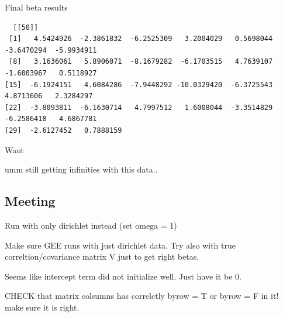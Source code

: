 \documentclass[10pt]{article}
\theoremstyle{definition}
\begin{document}
Final beta results
\begin{verbatim}
  [[50]]
 [1]   4.5424926  -2.3861832  -6.2525309   3.2004029   0.5698044  -3.6470294  -5.9934911
 [8]   3.1636061   5.8906071  -8.1679282  -6.1703515   4.7639107  -1.6003967   0.5118927
[15]  -6.1924151   4.6084286  -7.9448292 -10.0329420  -6.3725543   4.8713606   2.3284297
[22]  -3.8093811  -6.1630714   4.7997512   1.6008044  -3.3514829  -6.2586418   4.6867781
[29]  -2.6127452   0.7888159
\end{verbatim}

Want


umm still getting infinities with this data..



\subsection{Meeting}
Run with only dirichlet instead (set omega = 1)

Make sure GEE runs with just dirichlet data.
Try also with true correltion/covariance matrix V just to get right betas.

Seems like intercept term did not initialize well. Just have it be 0.

CHECK that matrix colsumns has correlctly byrow = T or byrow = F in it! make sure it is right.
\end{document}
